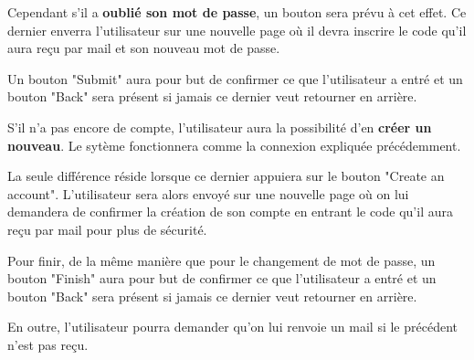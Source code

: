 \begin{flushleft}
Cependant s'il a \textbf{oublié son mot de passe}, un bouton sera prévu à cet effet.
Ce dernier enverra l'utilisateur sur une nouvelle page où il devra inscrire le code qu'il aura reçu par mail et son nouveau mot de passe.
\end{flushleft}

\begin{flushleft}
Un bouton "Submit" aura pour but de confirmer ce que l'utilisateur a entré et un bouton "Back" sera présent si jamais ce dernier veut retourner en arrière.
\end{flushleft}


\begin{flushleft}
S'il n'a pas encore de compte, l'utilisateur aura la possibilité d'en \textbf{créer un nouveau}. 
Le sytème fonctionnera comme la connexion expliquée précédemment.
\end{flushleft}

\begin{flushleft}
La seule différence réside lorsque ce dernier appuiera sur le bouton "Create an account". 
L'utilisateur sera alors envoyé sur une nouvelle page où on lui demandera de confirmer la création de son compte en entrant le code qu'il aura reçu par mail pour plus de sécurité.
\end{flushleft}

\begin{flushleft}
Pour finir, de la même manière que pour le changement de mot de passe, un bouton "Finish" aura pour but de confirmer ce que l'utilisateur a entré et un bouton "Back" sera présent si jamais ce dernier veut retourner en arrière.
\end{flushleft}

\begin{flushleft}
En outre, l'utilisateur pourra demander qu'on lui renvoie un mail si le précédent n'est pas reçu.
\end{flushleft}\

\newpage


\newpage
